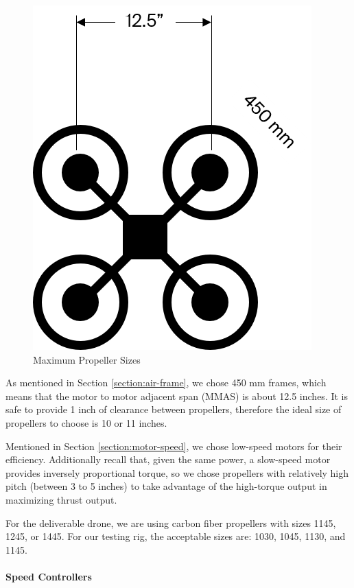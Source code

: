 \begin{figure}[h]
    \centering
    \includegraphics[scale=0.5]{img/framepropsize}
    \caption{Maximum Propeller Sizes}
    \label{fig:framepropsize}
\end{figure}

As mentioned in Section \ref{section:air-frame}, we chose 450 mm frames, which means that the motor to motor 
adjacent span (MMAS) is about 12.5 inches. It is safe to provide 1 inch of clearance between propellers, 
therefore the ideal size of propellers to choose is 10 or 11 inches.

Mentioned in Section \ref{section:motor-speed}, we chose low-speed motors for their efficiency. Additionally recall that, 
given the same power, a slow-speed motor provides inversely proportional torque, so we chose propellers 
with relatively high pitch (between 3 to 5 inches) to take advantage of the high-torque output in maximizing thrust output.

For the deliverable drone, we are using carbon fiber propellers with sizes 1145, 1245, or 1445. For our testing rig, the acceptable sizes are: 1030, 1045, 1130, and 1145.

\paragraph{Speed Controllers}

